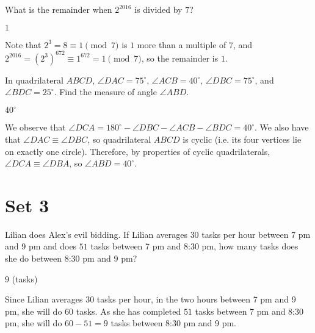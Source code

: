 \documentclass[11pt]{article}
\begin{document}
\begin{problem}%
What is the remainder when $2^{2016}$ is divided by $7$?
\end{problem}

\begin{answer}
$\boxed{1}$
\end{answer}

\begin{solution}
Note that $2^3 = 8 \equiv 1 \pmod{7}$ is $1$ more than a multiple of $7$, and $2^{2016} = (2^3)^{672} \equiv 1^{672} = 1 \pmod{7}$, so the remainder is $\boxed{1}$.
\end{solution}


\begin{problem}%
In quadrilateral $ABCD$, $\angle DAC = 75^\circ$, $\angle ACB = 40^\circ$, $\angle DBC = 75^\circ$, and $\angle BDC = 25^\circ$. Find the measure of angle $\angle ABD$.
\end{problem}

\begin{answer}
$\boxed{40^\circ}$
\end{answer}

\begin{solution}
We observe that $\angle DCA = 180^\circ - \angle DBC - \angle ACB - \angle BDC = 40^\circ$. We also have that $\angle DAC \equiv \angle DBC$, so quadrilateral $ABCD$ is cyclic (i.e. its four vertices lie on exactly one circle). Therefore, by properties of cyclic quadrilaterals, $\angle DCA \equiv \angle DBA$, so $\angle ABD = \boxed{40^\circ}$.
\end{solution}

\newpage

\section*{Set 3}

\begin{problem}%
Lilian does Alex's evil bidding. If Lilian averages $30$ tasks per hour between 7 pm and 9 pm and does $51$ tasks between 7 pm and 8:30 pm, how many tasks does she do between 8:30 pm and 9 pm?
\end{problem}

\begin{answer}
$\boxed{9}$ (tasks)
\end{answer}

\begin{solution}
Since Lilian averages $30$ tasks per hour, in the two hours between 7 pm and 9 pm, she will do $60$ tasks. As she has completed $51$ tasks between 7 pm and 8:30 pm, she will do $60 - 51 = \boxed{9}$ tasks between 8:30 pm and 9 pm.
\end{solution}
\end{document}
